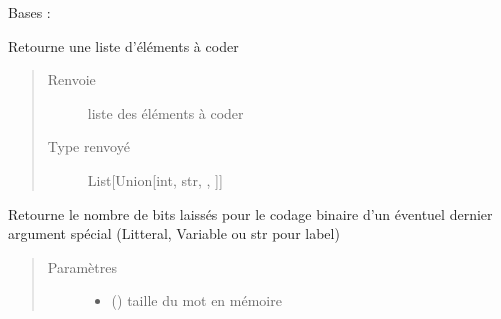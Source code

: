 \documentclass[letterpaper,10pt,french]{sphinxmanual}
\begin{document}
\begin{fulllineitems}
\label{\detokenize{assembleurlines:assembleurlines.AsmLine}}
Bases : 

\begin{fulllineitems}
\label{\detokenize{assembleurlines:assembleurlines.AsmLine.getElementsToCode}}
Retourne une liste d’éléments à coder
\begin{quote}\begin{description}
\item[{Renvoie}] \leavevmode
liste des éléments à coder

\item[{Type renvoyé}] \leavevmode
List{[}Union{[}int, str, {\hyperref[\detokenize{variable:variable.Variable}]{}}, {\hyperref[\detokenize{litteral:litteral.Litteral}]{}}{]}{]}

\end{description}\end{quote}

\end{fulllineitems}


\begin{fulllineitems}
\label{\detokenize{assembleurlines:assembleurlines.AsmLine.getLastOperandSize}}
Retourne le nombre de bits laissés pour le codage binaire d’un éventuel dernier argument spécial (Litteral, Variable ou str pour label)
\begin{quote}\begin{description}
\item[{Paramètres}] \leavevmode\begin{itemize}
\item {} 
 () \textendash{} taille du mot en mémoire


\end{itemize}
\end{description}
\end{quote}
\end{fulllineitems}
\end{fulllineitems}
\end{document}
